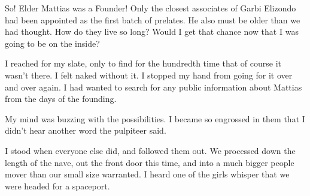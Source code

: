 So! Elder Mattias was a Founder! Only the closest associates of Garbi Elizondo had been appointed as the first batch of prelates. He also must be older than we had thought. How do they live so long? Would I get that chance now that I was going to be on the inside?

I reached for my slate, only to find for the hundredth time that of course it wasn't there. I felt naked without it. I stopped my hand from going for it over and over again. I had wanted to search for any public information about Mattias from the days of the founding.

My mind was buzzing with the possibilities. I became so engrossed in them that I didn't hear another word the pulpiteer said.

I stood when everyone else did, and followed them out. We processed down the length of the nave, out the front door this time, and into a much bigger people mover than our small size warranted. I heard one of the girls whisper that we were headed for a spaceport.

\newpage
\thispagestyle{empty}
